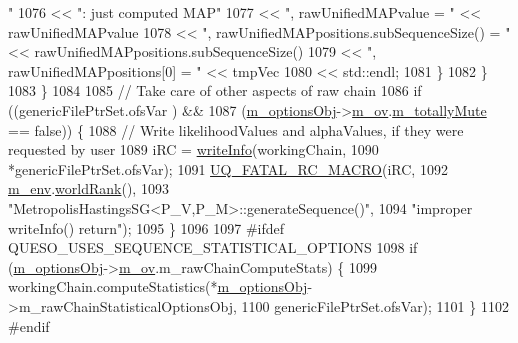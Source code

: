 \begin{DoxyCode}
{      "}
1076                                 << \textcolor{stringliteral}{": just computed MAP"}
1077                                 << \textcolor{stringliteral}{", rawUnifiedMAPvalue = "}                       << rawUnifiedMAPvalue
1078                                 << \textcolor{stringliteral}{", rawUnifiedMAPpositions.subSequenceSize() = "} << 
      rawUnifiedMAPpositions.subSequenceSize()
1079                                 << \textcolor{stringliteral}{", rawUnifiedMAPpositions[0] = "}                << tmpVec
1080                                 << std::endl;
1081       \}
1082     \}
1083   \}
1084 
1085   \textcolor{comment}{// Take care of other aspects of raw chain}
1086   \textcolor{keywordflow}{if} ((genericFilePtrSet.ofsVar                 ) &&
1087       (\hyperlink{class_q_u_e_s_o_1_1_metropolis_hastings_s_g_a5d0bc9f73d50d272aa6bfb5ef5939ef3}{m\_optionsObj}->\hyperlink{class_q_u_e_s_o_1_1_metropolis_hastings_s_g_options_a9d4792d9fc2dc5439b8ab489b0c236eb}{m\_ov}.\hyperlink{class_q_u_e_s_o_1_1_mh_options_values_af812309e81191e88dfdc87c5815141a3}{m\_totallyMute} == \textcolor{keyword}{false})) \{
1088     \textcolor{comment}{// Write likelihoodValues and alphaValues, if they were requested by user}
1089     iRC = \hyperlink{class_q_u_e_s_o_1_1_metropolis_hastings_s_g_ae354fe11a3f89df768b15f1743567db2}{writeInfo}(workingChain,
1090                     *genericFilePtrSet.ofsVar);
1091     \hyperlink{_defines_8h_aa9107e1a9a5197371a412db3fa349988}{UQ\_FATAL\_RC\_MACRO}(iRC,
1092                       \hyperlink{class_q_u_e_s_o_1_1_metropolis_hastings_s_g_ac8ea061e55b920e0c8f9bce5c3f20e52}{m\_env}.\hyperlink{class_q_u_e_s_o_1_1_base_environment_a78b57112bbd0e6dd0e8afec00b40ffa7}{worldRank}(),
1093                       \textcolor{stringliteral}{"MetropolisHastingsSG<P\_V,P\_M>::generateSequence()"},
1094                       \textcolor{stringliteral}{"improper writeInfo() return"});
1095   \}
1096 
1097 \textcolor{preprocessor}{#ifdef QUESO\_USES\_SEQUENCE\_STATISTICAL\_OPTIONS}
1098 \textcolor{preprocessor}{}  \textcolor{keywordflow}{if} (\hyperlink{class_q_u_e_s_o_1_1_metropolis_hastings_s_g_a5d0bc9f73d50d272aa6bfb5ef5939ef3}{m\_optionsObj}->\hyperlink{class_q_u_e_s_o_1_1_metropolis_hastings_s_g_options_a9d4792d9fc2dc5439b8ab489b0c236eb}{m\_ov}.m\_rawChainComputeStats) \{
1099     workingChain.computeStatistics(*\hyperlink{class_q_u_e_s_o_1_1_metropolis_hastings_s_g_a5d0bc9f73d50d272aa6bfb5ef5939ef3}{m\_optionsObj}->m\_rawChainStatisticalOptionsObj,
1100                                    genericFilePtrSet.ofsVar);
1101   \}
1102 \textcolor{preprocessor}{#endif}

\end{DoxyCode}
